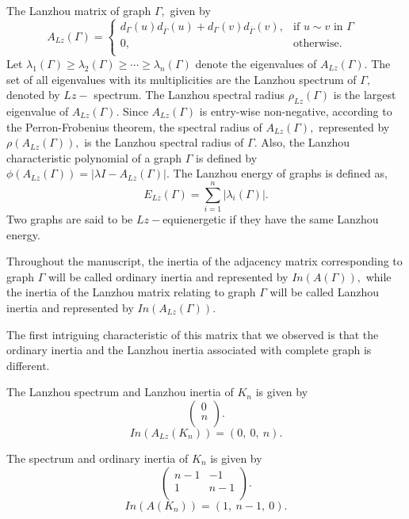 \documentclass[10pt,a4paper,oneside]{article}
\begin{document}
The Lanzhou matrix of graph $\Gamma,$ given by
$$A_{Lz}(\Gamma) =
\begin{cases} 
d_\Gamma(u)d_{\overline{\Gamma}}(u)+d_\Gamma(v)d_{\overline{\Gamma}}(v), &\text{if $u\sim v$ in $\Gamma$ } \\
	0, &\text{otherwise.}\\
\end{cases}$$
Let $\lambda_1(\Gamma)\geq \lambda_2(\Gamma) \geq \cdots \geq \lambda_n(\Gamma)$ denote the eigenvalues of $A_{Lz}(\Gamma).$ The set of all eigenvalues with its multiplicities are the Lanzhou spectrum of $\Gamma,$  denoted by $Lz-$ spectrum. The Lanzhou spectral radius $\rho_{Lz}(\Gamma)$ is the largest eigenvalue of $A_{Lz}(\Gamma).$ Since $A_{Lz}(\Gamma)$ is entry-wise non-negative, according to the Perron-Frobenius theorem, the spectral radius of $A_{Lz}(\Gamma),$ represented by $\rho(A_{Lz}(\Gamma)),$ is the Lanzhou spectral radius of $\Gamma.$ Also, the Lanzhou characteristic polynomial of a graph $\Gamma$ is defined by $\phi(A_{Lz}(\Gamma))= \vert \lambda I - A_{Lz}(\Gamma)\vert.$ The Lanzhou energy of graphs is defined as,
$$E_{Lz}(\Gamma)= \sum\limits_{i=1}^{n} \left\vert\lambda_i(\Gamma)\right\vert.$$
Two graphs are said to be $Lz-$equienergetic if they have the same Lanzhou energy. 


Throughout the manuscript, the inertia of the adjacency matrix corresponding to graph $\Gamma$ will be called ordinary inertia and represented by $In(A(\Gamma)),$ while the inertia of the Lanzhou matrix relating to graph $\Gamma$ will be called Lanzhou inertia and represented by $In(A_{Lz}(\Gamma)).$


The first intriguing characteristic of this matrix that we observed is that the ordinary inertia and the Lanzhou inertia associated with complete graph is different.


 The Lanzhou spectrum and Lanzhou inertia of $K_n$ is given by $$\begin{pmatrix}
		0 \\
		n \\
\end{pmatrix}.$$
$$In(A_{Lz}(K_n))=(0,\ 0,\ n).$$

The spectrum and ordinary inertia of $K_n$ is given by $$\begin{pmatrix}
		n-1& -1 \\
		1&n-1 \\
\end{pmatrix}.$$
 $$In(A(K_n))=(1,\ n-1,\ 0).$$
 
\end{document}
